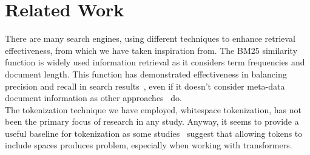 \section{Related Work}
\label{sec:related}

There are many search engines, using different techniques to enhance retrieval effectiveness, from which we have taken
inspiration from.
The BM25 similarity function is widely used information retrieval as it considers term frequencies and document length.
This function has demonstrated effectiveness in balancing precision and recall in search results~\cite{BM25}, even if it
doesn't consider meta-data document information as other approaches~\cite{robertson2009probabilistic} do.\\

The tokenization technique we have employed, whitespace tokenization, has not been the primary focus of research in any
study.
Anyway, it seems to provide a useful baseline for tokenization as some studies~\cite{gowsmith2022improving} suggest that
allowing tokens to include spaces produces problem, especially when working with transformers.